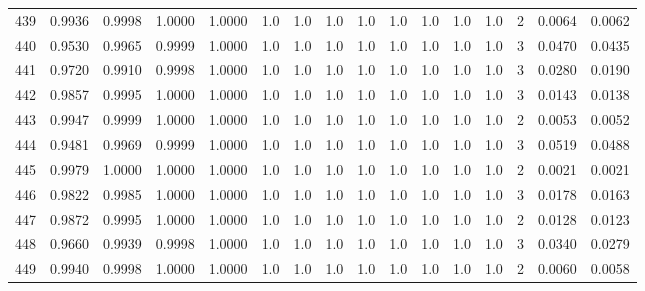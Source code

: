 \begin{tabular}{lrrrrrrrrrrrrrrr}
439 &      0.9936 &  0.9998 &  1.0000 &  1.0000 &     1.0 &     1.0 &     1.0 &     1.0 &     1.0 &     1.0 &      1.0 &        1.0 &      2 &                    0.0064 &                     0.0062 \\
440 &      0.9530 &  0.9965 &  0.9999 &  1.0000 &     1.0 &     1.0 &     1.0 &     1.0 &     1.0 &     1.0 &      1.0 &        1.0 &      3 &                    0.0470 &                     0.0435 \\
441 &      0.9720 &  0.9910 &  0.9998 &  1.0000 &     1.0 &     1.0 &     1.0 &     1.0 &     1.0 &     1.0 &      1.0 &        1.0 &      3 &                    0.0280 &                     0.0190 \\
442 &      0.9857 &  0.9995 &  1.0000 &  1.0000 &     1.0 &     1.0 &     1.0 &     1.0 &     1.0 &     1.0 &      1.0 &        1.0 &      3 &                    0.0143 &                     0.0138 \\
443 &      0.9947 &  0.9999 &  1.0000 &  1.0000 &     1.0 &     1.0 &     1.0 &     1.0 &     1.0 &     1.0 &      1.0 &        1.0 &      2 &                    0.0053 &                     0.0052 \\
444 &      0.9481 &  0.9969 &  0.9999 &  1.0000 &     1.0 &     1.0 &     1.0 &     1.0 &     1.0 &     1.0 &      1.0 &        1.0 &      3 &                    0.0519 &                     0.0488 \\
445 &      0.9979 &  1.0000 &  1.0000 &  1.0000 &     1.0 &     1.0 &     1.0 &     1.0 &     1.0 &     1.0 &      1.0 &        1.0 &      2 &                    0.0021 &                     0.0021 \\
446 &      0.9822 &  0.9985 &  1.0000 &  1.0000 &     1.0 &     1.0 &     1.0 &     1.0 &     1.0 &     1.0 &      1.0 &        1.0 &      3 &                    0.0178 &                     0.0163 \\
447 &      0.9872 &  0.9995 &  1.0000 &  1.0000 &     1.0 &     1.0 &     1.0 &     1.0 &     1.0 &     1.0 &      1.0 &        1.0 &      2 &                    0.0128 &                     0.0123 \\
448 &      0.9660 &  0.9939 &  0.9998 &  1.0000 &     1.0 &     1.0 &     1.0 &     1.0 &     1.0 &     1.0 &      1.0 &        1.0 &      3 &                    0.0340 &                     0.0279 \\
449 &      0.9940 &  0.9998 &  1.0000 &  1.0000 &     1.0 &     1.0 &     1.0 &     1.0 &     1.0 &     1.0 &      1.0 &        1.0 &      2 &                    0.0060 &                     0.0058 \\

\end{tabular}
